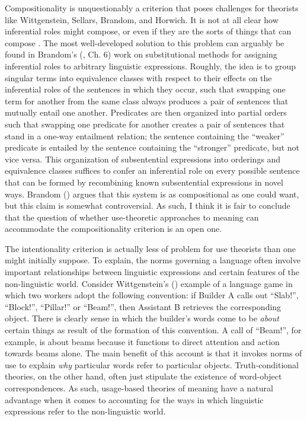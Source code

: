 Compositionality is unquestionably a criterion that poses challenges for theorists like Wittgenstein, Sellars, Brandom, and Horwich. It is not at all clear how inferential roles might compose, or even if they are the sorts of things that can compose \citep{FodorLepore:1991}. The most well-developed solution to this problem can arguably be found in Brandom's (\citeyear{Brandom:1994}, Ch. 6) work on substitutional methods for assigning inferential roles to arbitrary linguistic expressions. Roughly, the idea is to group singular terms into equivalence classes with respect to their effects on the inferential roles of the sentences in which they occur, such that swapping one term for another from the same class always produces a pair of sentences that mutually entail one another. Predicates are then organized into partial orders such that swapping one predicate for another creates a pair of sentences that stand in a one-way entailment relation; the sentence containing the ``weaker'' predicate is entailed by the sentence containing the ``stronger'' predicate, but not vice versa. This organization of subsentential expressions into orderings and equivalence classes suffices to confer an inferential role on every possible sentence that can be formed by recombining known subsentential expressions in novel ways. Brandom (\citeyear{Brandom:1994}) argues that this system is as compositional as one could want, but this claim is somewhat controversial. As such, I think it is fair to conclude that the question of whether use-theoretic approaches to meaning can accommodate the compositionality criterion is an open one. 

The intentionality criterion is actually less of problem for use theorists than one might initially suppose. To explain, the norms governing a language often involve important relationships between linguistic expressions and certain features of the non-linguistic world. Consider Wittgenstein's (\citeyear{Wittgenstein:1953}) example of a language game in which two workers adopt the following convention: if Builder A calls out ``Slab!'', ``Block!'', ``Pillar!'' or ``Beam!'', then Assistant B retrieves the corresponding object. There is clearly sense in which the builder's words come to be \textit{about} certain things as result of the formation of this convention. A call of ``Beam!'', for example, is about beams because it functions to direct attention and action towards beams alone. The main benefit of this account is that it invokes norms of use to explain \textit{why} particular words refer to particular objects. Truth-conditional theories, on the other hand, often just stipulate the existence of word-object correspondences. As such, usage-based theories of meaning have a natural advantage when it comes to accounting for the ways in which linguistic expressions refer to the non-linguistic world. 

